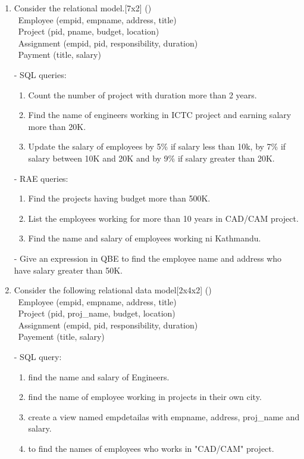 \documentclass[12pt]{article}
\newcommand{\enter}{\\\textcolor{white}{1}}
\begin{document}
\begin{enumerate}
    \item Consider the relational model.\hfill[7x2] ()
        \enter Employee (empid, empname, address, title)
        \enter Project (pid, pname, budget, location)
        \enter Assignment (empid, pid, responsibility, duration)
        \enter Payment (title, salary)
        
        - SQL queries:  
        \begin{enumerate}[noitemsep, topsep = 0pt, label = \alph*.]
                \item Count the number of project with duration more than 2 years.
                \item Find the name of engineers working in ICTC project and earning salary more than 20K.
            \item Update the salary of employees by 5\% if salary less than 10k, by 7\% if salary between 10K and 20K and by 9\% if salary greater than 20K.
        \end{enumerate}

        - RAE queries:  
        \begin{enumerate}[noitemsep, topsep = 0pt, label = \alph*.]
                \item Find the projects having budget more than 500K.
                \item List the employees working for more than 10 years in CAD/CAM project.
            \item Find the name and salary of employees working ni Kathmandu.
        \end{enumerate}  

        - Give an expression in QBE to find the employee name and address who have salary greater than 50K.

    \item Consider the following relational data model\hfill[2x4x2] ()
        \enter Employee (empid, empname, address, title)
        \enter Project (pid, proj\_name, budget, location)
        \enter Assignment (empid, pid, responsibility, duration)
        \enter Payement (title, salary)

        - SQL query:
        \begin{enumerate}[noitemsep, topsep = 0pt, label = \alph*.]
            \item find the name and salary of Engineers.
            \item find the name of employee working in projects in their own city.
            \item create a view named empdetailas with empname, address, proj\_name and salary.
            \item to find the names of employees who works in "CAD/CAM" project.
        \end{enumerate}


\end{enumerate}
\end{document}

